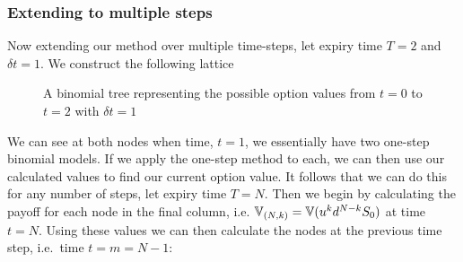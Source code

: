 \subsubsection{Extending to multiple steps}

Now extending our method over multiple time-steps, let expiry time \(T = 2\) and \(\delta t = 1\). We construct the following lattice

\begin{figure}[H]
    \centering
    \caption{A binomial tree representing the possible option values from \(t = 0\) to \(t = 2\) with \(\delta t = 1\)}\label{}
\end{figure}

We can see at both nodes when time, \(t = 1\), we essentially have two one-step binomial models. If we apply the one-step method to each, we can then use our calculated values to find our current option value.
\nline{}
It follows that we can do this for any number of steps, let expiry time \(T = N\). Then we begin by calculating the payoff for each node in the final column, i.e. \(\mathbb{V}_{\left(N,k\right)} = \mathbb{V}(u^k d^{N-k}S_0)\) at time \(t=N\). Using these values we can then calculate the nodes at the previous time step, i.e.~time \(t = m = N-1\):

